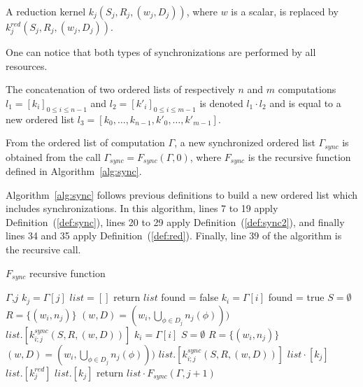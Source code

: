 \begin{mydef}
A reduction kernel $k_j(S_j,R_j,(w_j,D_j))$, where $w$ is a scalar, is replaced by $k^{red}_j(S_j,R_j,(w_j,D_j))$. %
\label{def:red}
\end{mydef}

One can notice that both types of synchronizations are performed by all resources.

\begin{mydef}
The concatenation of two ordered lists of respectively $n$ and $m$ computations $l_1=[k_i]_{0 \leq i \leq n-1}$ and $l_2=[k'_i]_{0 \leq i \leq m-1}$ is denoted $l_1 \cdot l_2$ and is equal to a new ordered list $l_3=[k_0,\dots,k_{n-1},k'_0,\dots,k'_{m-1}]$.
\end{mydef}

\begin{mydef}
From the ordered list of computation $\Gamma$, a new synchronized ordered list $\Gamma_{sync}$ is obtained from the call $\Gamma_{sync} = F_{sync}(\Gamma,0)$, where $F_{sync}$ is the recursive function defined in Algorithm~\ref{alg:sync}.
\end{mydef}

Algorithm~\ref{alg:sync} follows previous definitions to build a new ordered list which includes synchronizations. In this algorithm, lines 7 to 19 apply Definition~(\ref{def:sync}), lines 20 to 29 apply Definition~(\ref{def:sync2}), and finally lines 34 and 35 apply Definition~(\ref{def:red}). Finally, line 39 of the algorithm is the recursive call.

\begin{algorithm}
\caption{$F_{sync}$ recursive function}
\label{alg:sync}
\begin{algorithmic}[1]
 {$\Gamma$,$j$}
\State $k_j = \Gamma[j]$
\State $list = []$
\State return $list$
\State found = false
\State $k_i = \Gamma[i]$
\State found = true
\State $S = \emptyset$
\State $R = \{(w_i,n_j)\}$
\State $(w,D) = (w_i,\bigcup_{\phi \in D_j} n_j(\phi)))$
\State $list.[k_{i;j}^{sync}(S,R,(w,D))]$%
\EndIf
\EndFor
{}
\State $k_i = \Gamma[i]$
\State $S = \emptyset$
\State $R = \{(w_i,n_j)\}$
\State $(w,D) = (w_i,\bigcup_{\phi \in D_j} n_j(\phi)))$
\State $list.[k_{i;j}^{sync}(S,R,(w,D))]$%
\EndIf
\EndFor
\EndIf
\State $list \cdot [k_j]$
\EndFor
{}
\State $list.[k^{red}_j]$
\Else
\State $list.[k_j]$
\EndIf
\State return $list \cdot F_{sync}(\Gamma,j+1)$
\EndProcedure
\end{algorithmic}
\end{algorithm}


